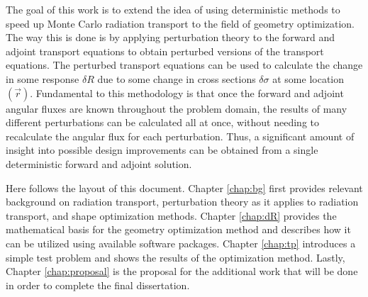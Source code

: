 The goal of this work is to extend the idea of using deterministic methods to speed up Monte Carlo radiation transport to the field of geometry optimization.
The way this is done is by applying perturbation theory to the forward and adjoint transport equations to obtain perturbed versions of the transport equations.
The perturbed transport equations can be used to calculate the change in some response $\delta R$ due to some change in cross sections $\delta\sigma$ at some location $\left(\vec{r}\right)$.
Fundamental to this methodology is that once the forward and adjoint angular fluxes are known throughout the problem domain, the results of many different perturbations can be calculated all at once, without needing to recalculate the angular flux for each perturbation.
Thus, a significant amount of insight into possible design improvements can be obtained from a single deterministic forward and adjoint solution.

Here follows the layout of this document.
Chapter \ref{chap:bg} first provides relevant background on radiation transport, perturbation theory as it applies to radiation transport, and shape optimization methods.
Chapter \ref{chap:dR} provides the mathematical basis for the geometry optimization method and describes how it can be utilized using available software packages.
Chapter \ref{chap:tp} introduces a simple test problem and shows the results of the optimization method.
Lastly, Chapter \ref{chap:proposal} is the proposal for the additional work that will be done in order to complete the final dissertation.


